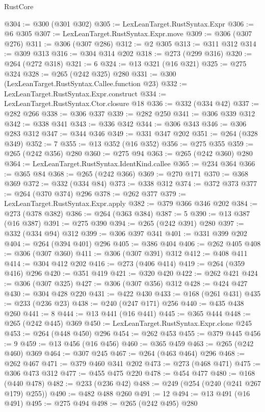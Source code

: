\begin{lexlean}{RustCore}
\begin{coremodule}
@304 := @300 (@301 @302)
@305 := LexLeanTarget.RustSyntax.Expr
@306 := @6 @305
@307 := LexLeanTarget.RustSyntax.Expr.move
@309 := @306 (@307 @276)
@311 := @306 (@307 @286)
@312 := @2 @305
@313 := @311 @312
@314 := @309 @313
@316 := @304 @314 @202
@318 := @273 (@299 @316)
@320 := @264 (@272 @318)
@321 := 6
@324 := @13 @321 (@16 @321)
@325 := @275 @324
@328 := @265 (@242 @325) @280
@331 := @300 (LexLeanTarget.RustSyntax.Callee.function @23)
@332 := LexLeanTarget.RustSyntax.Expr.construct
@334 := LexLeanTarget.RustSyntax.Ctor.closure @18
@336 := @332 (@334 @42)
@337 := @282 @266
@338 := @306 @337
@339 := @282 @250
@341 := @306 @339 @312
@342 := @338 @341
@343 := @336 @342
@344 := @306 @343
@346 := @306 @283 @312
@347 := @344 @346
@349 := @331 @347 @202
@351 := @264 (@328 @349)
@352 := 7
@355 := @13 @352 (@16 @352)
@356 := @275 @355
@359 := @265 (@242 @356) @280
@360 := @275 @94
@363 := @265 (@242 @360) @280
@364 := LexLeanTarget.RustSyntax.IdentKind.callee
@365 := @234 @364
@366 := @365 @84
@368 := @265 (@242 @366)
@369 := @270 @171
@370 := @368 @369
@372 := @332 (@334 @84)
@373 := @338 @312
@374 := @372 @373
@377 := @264 (@370 @374) @296
@378 := @262 @377
@379 := LexLeanTarget.RustSyntax.Expr.apply
@382 := @379 @366 @346 @202
@384 := @273 (@378 @382)
@386 := @264 (@363 @384)
@387 := 5
@390 := @13 @387 (@16 @387)
@391 := @275 @390
@394 := @265 (@242 @391) @280
@397 := @332 (@334 @94) @312
@399 := @306 @397 @341
@401 := @331 @399 @202
@404 := @264 (@394 @401) @296
@405 := @386 @404
@406 := @262 @405
@408 := @306 (@307 @360)
@411 := @306 (@307 @391) @312
@412 := @408 @411
@414 := @304 @412 @202
@416 := @273 (@406 @414)
@419 := @264 (@359 @416) @296
@420 := @351 @419
@421 := @320 @420
@422 := @262 @421
@424 := @306 (@307 @325)
@427 := @306 (@307 @356) @312
@428 := @424 @427
@430 := @304 @428 @220
@431 := @422 @430
@433 := @168 (@261 @431)
@435 := @233 (@236 @23)
@438 := @240 (@247 @171) @256
@440 := @435 @438 @260
@441 := 8
@444 := @13 @441 (@16 @441)
@445 := @365 @444
@448 := @265 (@242 @445) @369
@450 := LexLeanTarget.RustSyntax.Expr.clone @245
@453 := @264 (@448 @450) @296
@454 := @262 @453
@455 := @379 @445
@456 := 9
@459 := @13 @456 (@16 @456)
@460 := @365 @459
@463 := @265 (@242 @460) @369
@464 := @307 @245
@467 := @264 (@463 @464) @296
@468 := @262 @467
@471 := @379 @460 @341 @202
@473 := @273 (@468 @471)
@475 := @306 @473 @312
@477 := @455 @475 @220
@478 := @454 @477
@480 := @168 (@440 @478)
@482 := @233 (@236 @42)
@488 := @249 (@254 (@240 (@241 @267 @179) @255))
@490 := @482 @488 @260
@491 := 12
@494 := @13 @491 (@16 @491)
@495 := @275 @494
@498 := @265 (@242 @495) @280

\end{coremodule}
\end{lexlean}
